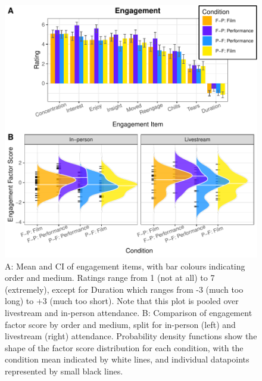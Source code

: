 \documentclass[
  man,floatsintext]{apa6}
\begin{document}
\begin{figure}
\centering
\includegraphics{Schlichting_MSc_Thesis_files/figure-latex/engagement-plots-1.pdf}
\caption{\label{fig:engagement-plots}A: Mean and CI of engagement items, with bar colours indicating order and medium. Ratings range from 1 (not at all) to 7 (extremely), except for Duration which ranges from -3 (much too long) to +3 (much too short). Note that this plot is pooled over livestream and in-person attendance. B: Comparison of engagement factor score by order and medium, split for in-person (left) and livestream (right) attendance. Probability density functions show the shape of the factor score distribution for each condition, with the condition mean indicated by white lines, and individual datapoints represented by small black lines.}
\end{figure}
\end{document}
